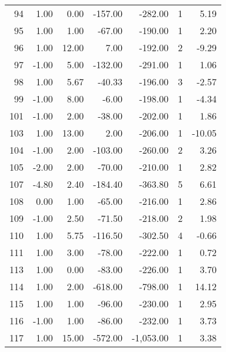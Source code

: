 \begin{appendices}
\begin{longtable}[c]{@{}rrrrrrr@{}}
94 & 1.00 & 0.00 & -157.00 & -282.00 & 1 & 5.19 \\

95 & 1.00 & 1.00 & -67.00 & -190.00 & 1 & 2.20 \\

96 & 1.00 & 12.00 & 7.00 & -192.00 & 2 & -9.29 \\

97 & -1.00 & 5.00 & -132.00 & -291.00 & 1 & 1.06 \\

98 & 1.00 & 5.67 & -40.33 & -196.00 & 3 & -2.57 \\

99 & -1.00 & 8.00 & -6.00 & -198.00 & 1 & -4.34 \\

101 & -1.00 & 2.00 & -38.00 & -202.00 & 1 & 1.86 \\

103 & 1.00 & 13.00 & 2.00 & -206.00 & 1 & -10.05 \\

104 & -1.00 & 2.00 & -103.00 & -260.00 & 2 & 3.26 \\

105 & -2.00 & 2.00 & -70.00 & -210.00 & 1 & 2.82 \\

107 & -4.80 & 2.40 & -184.40 & -363.80 & 5 & 6.61 \\

108 & 0.00 & 1.00 & -65.00 & -216.00 & 1 & 2.86 \\

109 & -1.00 & 2.50 & -71.50 & -218.00 & 2 & 1.98 \\

110 & 1.00 & 5.75 & -116.50 & -302.50 & 4 & -0.66 \\

111 & 1.00 & 3.00 & -78.00 & -222.00 & 1 & 0.72 \\

113 & 1.00 & 0.00 & -83.00 & -226.00 & 1 & 3.70 \\

114 & 1.00 & 2.00 & -618.00 & -798.00 & 1 & 14.12 \\

115 & 1.00 & 1.00 & -96.00 & -230.00 & 1 & 2.95 \\

116 & -1.00 & 1.00 & -86.00 & -232.00 & 1 & 3.73 \\

117 & 1.00 & 15.00 & -572.00 & -1,053.00 & 1 & 3.38 \\


\end{longtable}
\end{appendices}
